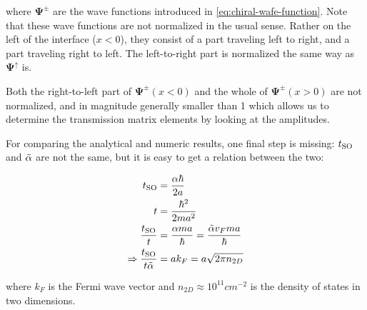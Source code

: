 where $\mathbf{\Psi^\pm}$ are the wave functions introduced in
\ref{eq:chiral-wafe-function}. Note that these wave functions are not
normalized in the usual sense. Rather on the left of the interface ($x < 0$),
they consist of a part traveling left to right, and a part traveling right to
left. The left-to-right part is normalized the same way as
$\mathbf{\Psi^\uparrow}$
is.

Both the right-to-left part of $\mathbf{\Psi^\pm}(x < 0)$ and the whole of
$\mathbf{\Psi^\pm}(x > 0)$ are not normalized, and in magnitude generally
smaller than 1 which allows us to determine the transmission matrix elements
by looking at the amplitudes.

For comparing the analytical and numeric results, one final step is missing:
$t_{\textnormal{SO}}$ and $\tilde \alpha$ are not the same, but it is easy to get a relation between the
two:

\begin{align}
    t_{\textnormal{SO}} &= \frac{\alpha\hbar}{2a}\\
    t    &= \frac{\hbar^2}{2 m a^2}\\
    \frac{t_{\textnormal{SO}}}{t} &= \frac{\alpha m a}{\hbar} = \frac{\tilde \alpha v_F m a}{\hbar} \\
    \Rightarrow \frac{t_{\textnormal{SO}}}{t \tilde \alpha} &= a k_F = a \sqrt{2 \pi n_{2D}}
\end{align}

where $k_F$ is the Fermi wave vector and $n_{2D} \approx 10^{11} cm^{-2}$ is
the density of states in two dimensions.

